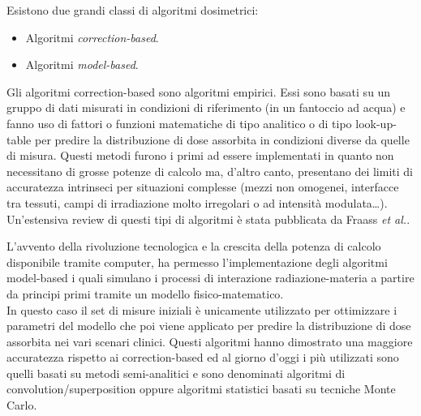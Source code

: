 Esistono due grandi classi di algoritmi dosimetrici:
\begin{itemize}
\item Algoritmi \textit{correction-based}.
\item Algoritmi \textit{model-based}.
\end{itemize}
Gli algoritmi correction-based sono algoritmi empirici. Essi sono  basati su un gruppo di dati misurati in condizioni di riferimento (in un fantoccio ad acqua) e fanno uso di fattori o funzioni matematiche di tipo analitico o di tipo look-up-table per predire la distribuzione di dose assorbita in condizioni diverse da quelle di misura. 
Questi metodi furono i primi ad essere implementati in quanto non necessitano di grosse potenze di calcolo ma, d'altro canto, presentano dei limiti di accuratezza intrinseci per situazioni complesse (mezzi non omogenei, interfacce tra tessuti, campi di irradiazione molto irregolari o ad intensità modulata\ldots). Un'estensiva review di questi tipi di algoritmi è stata pubblicata da Fraass \textit{et al.}\cite{Fraass1995}.

\vspace{.2cm}
L'avvento della rivoluzione tecnologica e la crescita della potenza di calcolo disponibile tramite computer, ha permesso l'implementazione degli algoritmi model-based i quali simulano i processi di interazione radiazione-materia  a partire da principi primi tramite un modello fisico-matematico.\\
In questo caso il set di misure iniziali è unicamente utilizzato per ottimizzare i parametri del modello che poi viene applicato per predire la distribuzione di dose assorbita nei vari scenari clinici. Questi algoritmi hanno dimostrato una maggiore accuratezza rispetto ai correction-based ed al giorno d'oggi i più utilizzati sono quelli basati su metodi semi-analitici e sono denominati algoritmi di convolution/superposition oppure algoritmi statistici basati su tecniche Monte Carlo.

